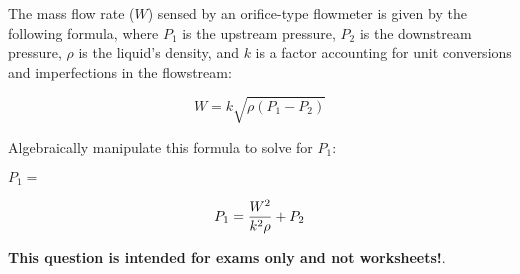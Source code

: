 

The mass flow rate ($W$) sensed by an orifice-type flowmeter is given by the following formula, where $P_1$ is the upstream pressure, $P_2$ is the downstream pressure, $\rho$ is the liquid's density, and $k$ is a factor accounting for unit conversions and imperfections in the flowstream:
 
$$W = k \sqrt{\rho (P_1 - P_2)}$$

Algebraically manipulate this formula to solve for $P_1$:

\vskip 20pt

$P_1 = $







$$P_1 = {W^2 \over k^2 \rho} + P_2$$







{\bf This question is intended for exams only and not worksheets!}.



